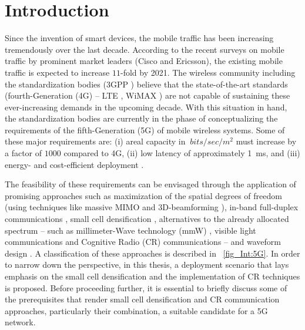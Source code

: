 \chapter{Introduction}
\label{chap:Int}

Since the invention of smart devices, the mobile traffic has been increasing tremendously over the last decade. According to the recent surveys on mobile traffic by prominent market leaders (Cisco \cite{CISCO14} and Ericsson\cite{Eric15}), the existing mobile traffic is expected to increase $11$-fold  by 2021. The wireless community including the standardization bodies (3GPP \cite{3GPP}) believe that the state-of-the-art standards (fourth-Generation (4G)  -- LTE , WiMAX ) are not capable of sustaining these ever-increasing demands in the upcoming decade. With this situation in hand, the standardization bodies are currently in the phase of conceptualizing the requirements of the fifth-Generation (5G)  of mobile wireless systems.
Some of these major requirements are: (i) areal capacity in $\SI{}{bits/sec/m^2}$ must increase by a factor of $1000$ compared to 4G, (ii) low latency of approximately \SI{1}{ms}, and (iii) energy- and cost-efficient deployment \cite{Qual13, Andrews14}.


The feasibility of these requirements can be envisaged through the application of promising approaches such as maximization of the spatial degrees of freedom (using techniques like massive MIMO \cite{Lar14} and 3D-beamforming \cite{Hal13}), in-band full-duplex communications  \cite{Sab14}, small cell densification \cite{Andrews12, Gel13}, alternatives to the already allocated spectrum -- such as millimeter-Wave technology (mmW) \cite{Rapp13}, visible light communications \cite{Wu14} and Cognitive Radio (CR) communications -- and waveform design \cite{Scha14, Baz15}. A classification of these approaches is described in \figurename~\ref{fig_Int:5G}. In order to narrow down the perspective, in this thesis, a deployment scenario that lays emphasis on the small cell densification and the implementation of CR techniques is proposed. Before proceeding further, it is essential to briefly discuss some of the prerequisites that render small cell densification and CR communication approaches, particularly their combination, a suitable candidate for a 5G network. 

